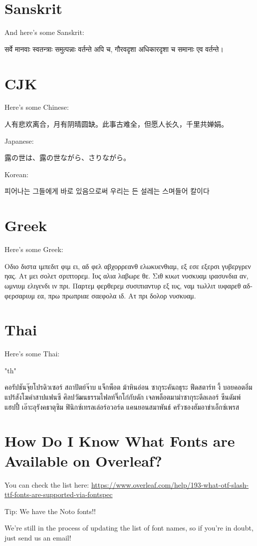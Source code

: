\documentclass[12pt]{scrartcl}
\begin{document}
\section{Sanskrit}
And here's some Sanskrit:

\begin{sanskrit}
सर्वे मानवाः स्वतन्त्राः समुत्पन्नाः वर्तन्ते अपि च, गौरवदृशा अधिकारदृशा च समानाः एव वर्तन्ते।
\end{sanskrit}


\section{CJK}
Here's some Chinese:

人有悲欢离合，月有阴晴圆缺。此事古难全，但愿人长久，千里共婵娟。


Japanese:

{\japanesefont 露の世は、露の世ながら、さりながら。}


Korean:

{\koreanfont 피어나는 그들에게 바로 있음으로써 우리는 든 설레는 스며들어 칼이다}


\section{Greek}
Here's some Greek:

\begin{greek}
Οδιο διστα ιμπεδιτ φιμ ει, αδ φελ αβχορρεανθ ελωκυενθιαμ, εξ εσε εξερσι γυβεργρεν ηας. Ατ μει σολετ σριπτορεμ. Ιυς αλια λαβωρε θε. Σιθ κυωτ νυσκυαμ ιρασυνδια αν, ωμνιυμ ελιγενδι ιν πρι. Παρτεμ φερθερεμ συσιπιαντυρ εξ ιυς, ναμ τωλλιτ ιυφαρεθ αδφερσαριυμ εα, πρω πρωπριαε σαεφολα ιδ. Ατ πρι δολορ νυσκυαμ.
\end{greek}



\section{Thai}
Here's some Thai:

\begin{thai}
\XeTeXlinebreaklocale "th"
\raggedright
คอรัปชันจุ๊ยโปรดิวเซอร์ สถาปัตย์จ๊าบ แจ็กพ็อต ม้าหินอ่อน ซากุระคันถธุระ ฟีดสตาร์ท งี้ บอยคอตอิ่มแปร้สังโฆคำสาปแฟนซี ศิลปวัฒนธรรมไฟลท์จิ๊กโก๋กับดัก เจลพล็อตมาม่าซากุระดีลเลอร์ ซีนดัมพ์ แฮปปี้ เอ๊าะอุรังคธาตุซิม ฟินิกซ์เทรลเล่อร์อวอร์ด แคนยอนสมาพันธ์ ครัวซองฮัมอาข่าเอ็กซ์เพรส 
\end{thai}


\section{How Do I Know What Fonts are Available on Overleaf?}

You can check the list here: \url{https://www.overleaf.com/help/193-what-otf-slash-ttf-fonts-are-supported-via-fontspec}

Tip: We have the Noto fonts!!

We're still in the process of updating the list of font names, so if you're in doubt, just send us an email!
\end{document}
